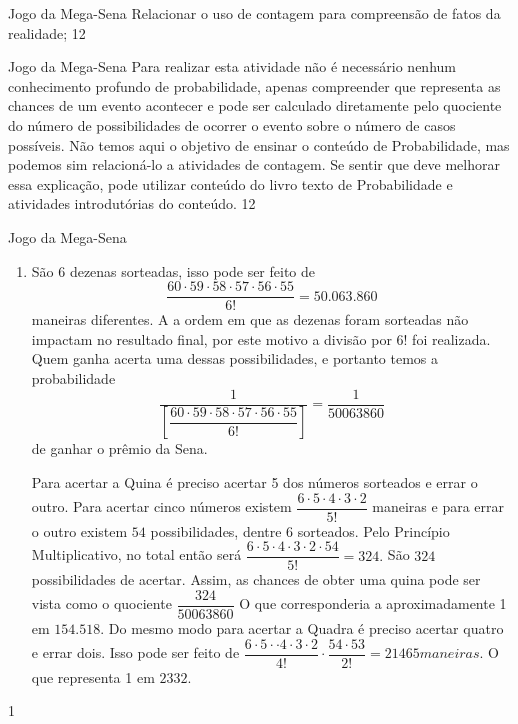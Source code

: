 \begin{objectives}{Jogo da Mega-Sena}
{
Relacionar o uso de contagem para compreensão de fatos da realidade;
}{1}{2}
\end{objectives}
\mspace{-2.25em}
\begin{sugestions}{Jogo da Mega-Sena}
{
Para realizar esta atividade não é necessário nenhum conhecimento profundo de probabilidade, apenas compreender que representa as chances de um evento acontecer e pode ser calculado diretamente pelo quociente do número de possibilidades de ocorrer o evento sobre o número de casos possíveis.  Não temos aqui o objetivo de ensinar o conteúdo de Probabilidade, mas podemos sim relacioná-lo a atividades de contagem. Se sentir que deve melhorar essa explicação, pode utilizar conteúdo do livro texto de Probabilidade e atividades introdutórias do conteúdo.
}{1}{2}
\end{sugestions}
\begin{answer}{Jogo da Mega-Sena}
{
\begin{enumerate}
\item São 6 dezenas sorteadas, isso pode ser feito de 
\small
$$\dfrac{60 \cdot 59\cdot 58 \cdot 57 \cdot 56 \cdot 55}{6!}= 50.063.860$$
\normalsize
maneiras diferentes. A a ordem em que as dezenas foram sorteadas não impactam no resultado final, por este motivo a divisão por $6!$ foi realizada. Quem ganha acerta uma dessas possibilidades, e portanto temos a probabilidade 
\small
$$\dfrac{1}{\left[\dfrac{60 \cdot 59\cdot 58 \cdot 57 \cdot 56 \cdot 55}{6!}\right]} = \dfrac{1}{50063860}$$
\normalsize
de ganhar o prêmio da Sena.

Para acertar a Quina é preciso acertar 5 dos números sorteados e errar o outro. Para acertar cinco  números  existem $\dfrac{6\cdot 5 \cdot 4 \cdot 3 \cdot 2}{5!}$ maneiras e para errar o outro existem $54$ possibilidades, dentre 6 sorteados. Pelo Princípio Multiplicativo, no total então será $\dfrac{6 \cdot 5 \cdot 4 \cdot 3 \cdot 2 \cdot 54}{5!} = 324.$ São $324$ possibilidades de acertar. Assim, as chances de obter uma quina pode ser vista como o quociente $\dfrac{324}{50063860}$ O que corresponderia a aproximadamente 1 em $154.518$. Do mesmo modo para acertar a Quadra é preciso acertar quatro e errar dois. Isso pode ser feito de $\dfrac{6 \cdot 5 \cdot \cdot 4 \cdot 3 \cdot 2}{4!}\cdot \dfrac{54\cdot53}{2!}=21465 maneiras.$ O que representa 1 em $2332.$
\end{enumerate}
}{1}
\end{answer}
